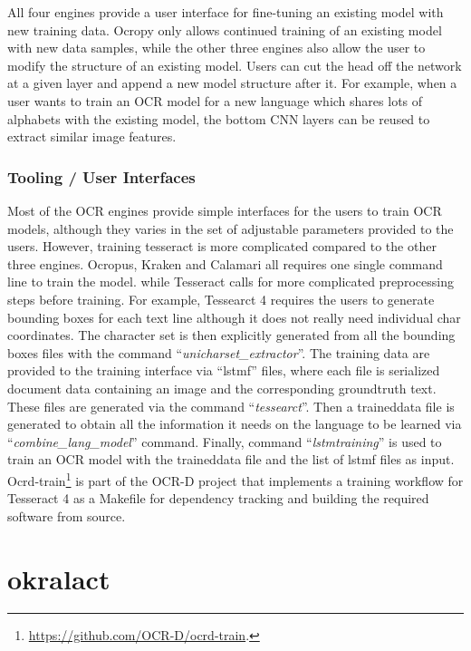 \documentclass[conference]{IEEEtran}
\begin{document}
All four engines provide a user interface for fine-tuning an
existing model with new training data. Ocropy only allows
continued training of an existing model with new data samples,
while the other three engines also allow the user to modify the
structure of an existing model. Users can cut the head off the
network at a given layer and append a new model structure after it.
For example, when a user wants to train an OCR model for a new
language which shares lots of alphabets with the existing model,
the bottom CNN layers can be reused to extract similar image
features.

\subsubsection*{Tooling / User Interfaces}

Most of the OCR engines provide simple interfaces for the users to
train OCR models, although they varies in the set of adjustable
parameters provided to the users. However, training tesseract is
more complicated compared to the other three engines. Ocropus,
Kraken and Calamari all requires one single command line to train
the model. while Tesseract calls for more complicated preprocessing
steps before training. For example, Tessearct 4 requires the users
to generate bounding boxes for each text line although it does not
really need individual char coordinates. The character set is then
explicitly generated from all the bounding boxes files with the
command ``\textit{unicharset\_extractor}''. The training data are
provided to the training interface via ``lstmf'' files, where each
file is serialized document data containing an image and the
corresponding groundtruth text. These files are generated via the
command ``\textit{tessearct}''. Then a traineddata file is generated
to obtain all the information it needs on the language to be
learned via ``\textit{combine\_lang\_model}'' command. Finally,
command ``\textit{lstmtraining}'' is used to train an OCR model with
the traineddata file and the list of lstmf files as input.
Ocrd-train\footnote{\url{https://github.com/OCR-D/ocrd-train}.} is
part of the OCR-D project that implements a training workflow for
Tesseract 4 as a Makefile for dependency tracking and building the
required software from source.  


\section*{okralact}
\end{document}
